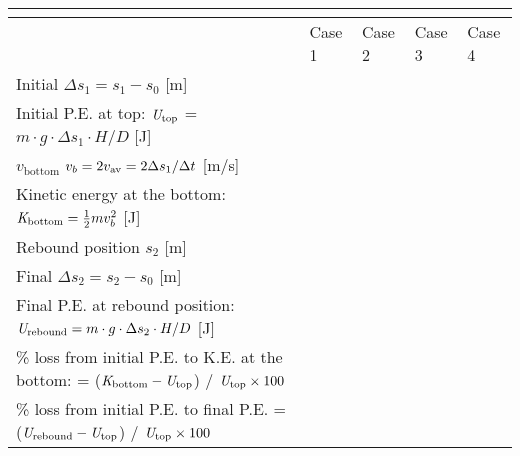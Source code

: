 \begin{table}[htbp]
	\centering
	\begin{tabular}{ C{7cm} | C{1.5cm} | C{1.5cm} | C{1.5cm} | C{1.5cm} } %

	\\

	\toprule
	& Case 1 & Case 2 & Case 3 & Case 4\\
	\midrule
	Initial $\Delta s_{1}=s_{1}-s_{0}$ [m]&  &  &  & \\
	\midrule
	\parbox[t]{7cm}{\centering Initial P.E. at top: \\ $\text{\it U}_{\text{top}}$ = $m \cdot g \cdot  \Delta s_{1} \cdot  H/D$ [J]}&  &  &  & \\
	\midrule
	\parbox[t]{7cm}{\centering $v_{\text{bottom}}$ \\ $v_{b}=2 v_{\rm av}=2 \Delta s_{1}/\Delta t$ [m/s]}&  &  &  & \\
	\midrule
	\parbox[t]{7cm}{\centering Kinetic energy at the bottom: \\ $\text{\it K}_{\text{bottom}}=\frac{1}{2}m v_{b}^{2}$ [J]}&  &  &  & \\
	\midrule
	Rebound position $s_{2}$ [m]&  &  &  & \\
	\midrule
	Final $\Delta s_{2}=s_{2}-s_{0}$ [m]&  &  &  & \\
	\midrule
	\parbox[t]{7cm}{\centering Final P.E. at rebound position: \\ $\text{\it U}_{\text{rebound}}= m \cdot g \cdot  \Delta s_{2} \cdot  H/D$ [J]}&  &  &  & \\
	\midrule
	\parbox[t]{7cm}{\centering \% loss from initial P.E. to \\ K.E. at the bottom: \\ = ($\text{\it K}_{\text{bottom}} - \text{\it U}_{\text{top}}$) / $\text{\it U}_{\text{top}} \times 100$} &  &  &  & \\
	\midrule
	\parbox[t]{7cm}{\centering \% loss from initial P.E. to final P.E. \\ = ($\text{\it U}_{\text{rebound}} - \text{\it U}_{\text{top}}$) / $\text{\it U}_{\text{top}} \times 100$} &  &  &  & \\
	\bottomrule
	\end{tabular}

	\label{aM04Tab02}
\end{table}
\restoregeometry

